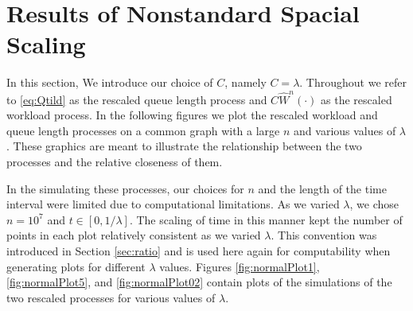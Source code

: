 \documentclass[12pt]{article}
\theoremstyle{plain}
\theoremstyle{definition}
\theoremstyle{remark}
\newcommand{\Wfhat}{\widehat{W}^{n}(\cdot)}
\begin{document}
\section{Results of Nonstandard Spacial Scaling} \label{sec:scaling}

In this section, We introduce our choice of $C$, namely $C = \lambda$. Throughout we refer to \eqref{eq:Qtild} as the rescaled queue length process and $C\Wfhat$ as the rescaled workload process. In the following figures we plot the rescaled workload and queue length processes on a common graph with a large $n$ and various values of $\lambda$. These graphics are meant to illustrate the relationship between the two processes and the relative closeness of them. 

In the simulating these processes, our choices for $n$ and the length of the time interval were limited due to computational limitations. As we varied $\lambda$, we chose $n = 10^{7}$ and $t \in [0, 1/\lambda]$. The scaling of time in this manner kept the number of points in each plot relatively consistent as we varied $\lambda$. This convention was introduced in Section \ref{sec:ratio} and is used here again for computability when generating plots for different $\lambda$ values. Figures \ref{fig:normalPlot1}, \ref{fig:normalPlot5}, and \ref {fig:normalPlot02} contain plots of the simulations of the two rescaled processes for various values of $\lambda$.
\end{document}
